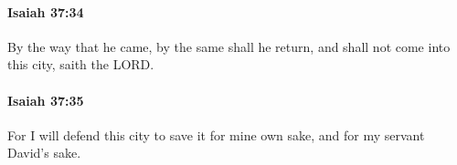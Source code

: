 		\paragraph{Isaiah 37:34} %
			\label{ISAIAH-37-34}

			By the way that he came, by the same shall he return, and shall not come into this city, saith the LORD.


		\paragraph{Isaiah 37:35} %
			\label{ISAIAH-37-35}

			For I will defend this city to save it for mine own sake, and for my servant David's sake.


